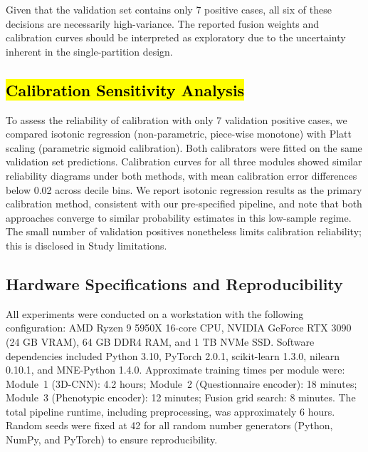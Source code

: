 \documentclass[10pt,letterpaper]{article}
\newcommand{\hlpar}[1]{\leavevmode\colorbox{yellow!30}{\parbox{\dimexpr\linewidth-2\fboxsep\relax}{#1}}\vspace{2pt}}
\begin{document}
                                                                                                          \hlpar{Given that the validation set contains only 7 positive cases, all six of these decisions are necessarily high-variance. The reported fusion weights and calibration curves should be interpreted as exploratory due to the uncertainty inherent in the single-partition design.}

                                                                                                          \subsection*{\hl{Calibration Sensitivity Analysis}}
                                                                                                          \hlpar{To assess the reliability of calibration with only 7 validation positive cases, we compared isotonic regression (non-parametric, piece-wise monotone) with Platt scaling (parametric sigmoid calibration). Both calibrators were fitted on the same validation set predictions. Calibration curves for all three modules showed similar reliability diagrams under both methods, with mean calibration error differences below 0.02 across decile bins. We report isotonic regression results as the primary calibration method, consistent with our pre-specified pipeline, and note that both approaches converge to similar probability estimates in this low-sample regime. The small number of validation positives nonetheless limits calibration reliability; this is disclosed in Study limitations.}

                                                                                                          \subsection*{Hardware Specifications and Reproducibility}
\hlpar{All experiments were conducted on a workstation with the following configuration: AMD Ryzen 9 5950X 16-core CPU, NVIDIA GeForce RTX 3090 (24 GB VRAM), 64 GB DDR4 RAM, and 1 TB NVMe SSD. Software dependencies included Python 3.10, PyTorch 2.0.1, scikit-learn 1.3.0, nilearn 0.10.1, and MNE-Python 1.4.0. Approximate training times per module were: Module~1 (3D-CNN): 4.2 hours; Module~2 (Questionnaire encoder): 18 minutes; Module~3 (Phenotypic encoder): 12 minutes; Fusion grid search: 8 minutes. The total pipeline runtime, including preprocessing, was approximately 6 hours. Random seeds were fixed at 42 for all random number generators (Python, NumPy, and PyTorch) to ensure reproducibility.}
\end{document}
